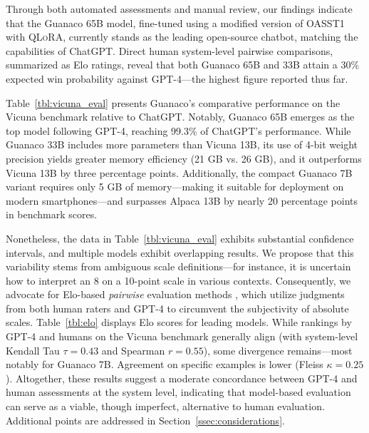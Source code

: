 Through both automated assessments and manual review, our findings indicate that the {Guanaco} 65B model, fine-tuned using a modified version of OASST1 with \textsc{QLoRA}, currently stands as the leading open-source chatbot, matching the capabilities of ChatGPT. Direct human system-level pairwise comparisons, summarized as Elo ratings, reveal that both {Guanaco} 65B and 33B attain a 30\% expected win probability against GPT-4—the highest figure reported thus far.

Table~\ref{tbl:vicuna_eval} presents {Guanaco}'s comparative performance on the Vicuna benchmark \cite{vicuna2023} relative to ChatGPT. Notably, {Guanaco} 65B emerges as the top model following GPT-4, reaching 99.3\% of ChatGPT’s performance. While {Guanaco} 33B includes more parameters than Vicuna 13B, its use of 4-bit weight precision yields greater memory efficiency (21 GB vs. 26 GB), and it outperforms Vicuna 13B by three percentage points. Additionally, the compact {Guanaco} 7B variant requires only 5 GB of memory—making it suitable for deployment on modern smartphones—and surpasses Alpaca 13B by nearly 20 percentage points in benchmark scores.

Nonetheless, the data in Table~\ref{tbl:vicuna_eval} exhibits substantial confidence intervals, and multiple models exhibit overlapping results. We propose that this variability stems from ambiguous scale definitions—for instance, it is uncertain how to interpret an 8 on a 10-point scale in various contexts. Consequently, we advocate for Elo-based \textit{pairwise} evaluation methods \citep{elo1967proposed}, which utilize judgments from both human raters and GPT-4 to circumvent the subjectivity of absolute scales. Table~\ref{tbl:elo} displays Elo scores for leading models. While rankings by GPT-4 and humans on the Vicuna benchmark generally align (with system-level Kendall Tau $\tau=0.43$ and Spearman $r=0.55$), some divergence remains—most notably for Guanaco 7B. Agreement on specific examples is lower (Fleiss $\kappa=0.25$). Altogether, these results suggest a moderate concordance between GPT-4 and human assessments at the system level, indicating that model-based evaluation can serve as a viable, though imperfect, alternative to human evaluation. Additional points are addressed in Section~\ref{ssec:considerations}.

